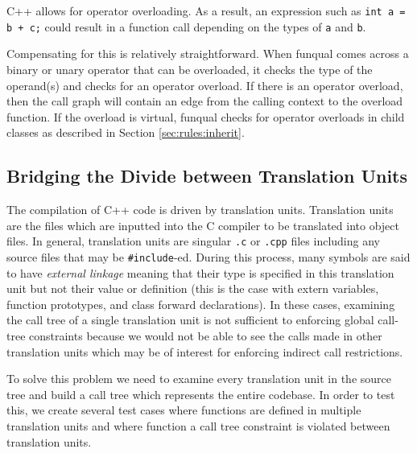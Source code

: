 C++ allows for operator overloading.  As a result, an expression such as \mbox{\lstinline{int a = b + c;}} could result in a function call depending on the types of \lstinline{a} and \lstinline{b}.  

Compensating for this is relatively straightforward.  When funqual comes across a binary or unary operator that can be overloaded, it checks the type of the operand(s) and checks for an operator overload.  If there is an operator overload, then the call graph will contain an edge from the calling context to the overload function.  If the overload is virtual, funqual checks for operator overloads in child classes as described in Section \ref{sec:rules:inherit}.

\subsection{Bridging the Divide between Translation Units}

The compilation of C++ code is driven by translation units.  Translation units are the files which are inputted into the C compiler to be translated into object files.  In general, translation units are singular \lstinline{.c} or \lstinline{.cpp} files including any source files that may be \lstinline{#include}-ed.  During this process, many symbols are said to have \textit{external linkage} meaning that their type is specified in this translation unit but not their value or definition (this is the case with extern variables, function prototypes, and class forward declarations).  In these cases, examining the call tree of a single translation unit is not sufficient to enforcing global call-tree constraints because we would not be able to see the calls made in other translation units which may be of interest for enforcing indirect call restrictions.  

To solve this problem we need to examine every translation unit in the source tree and build a call tree which represents the entire codebase.  In order to test this, we create several test cases where functions are defined in multiple translation units and where function a call tree constraint is violated between translation units.
